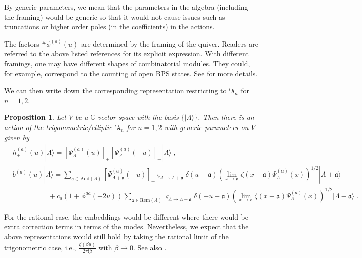 \documentclass[11pt]{article}
\numberwithin{equation}{section}
\numberwithin{figure}{section}
\numberwithin{table}{section}
\newtheorem{proposition}[theorem]{Proposition}
\newcommand{\ii}{\mathrm{i}}
\begin{document}
By generic parameters, we mean that the parameters in the algebra (including the framing) would be generic so that it would not cause issues such as truncations or higher order poles (in the coefficients) in the actions.

The factors ${}^\#\phi^{(a)}(u)$ are determined by the framing of the quiver. Readers are referred to the above listed references for its explicit expression. With different framings, one may have different shapes of combinatorial modules. They could, for example, correspond to the counting of open BPS states. See \cite{Galakhov:2021xum,Noshita:2021dgj} for more details.

We can then write down the corresponding representation restricting to ${}^\iota\mathtt{A}_n$ for $n=1,2$.
\begin{proposition}\label{iotaquiveralgYoungdiagramrep}
	Let $V$ be a $\mathbb{C}$-vector space with the basis $\{|\Lambda\rangle\}$. Then there is an action of the trigonometric/elliptic ${}^\iota\mathtt{A}_n$ for $n=1,2$ with generic parameters on $V$ given by
	\begin{subequations}
		\begin{align}
			&h^{(a)}_{\pm}(u)|\Lambda\rangle=\left[\Psi^{(a)}_\Lambda(u)\right]_\pm\left[\Psi^{(a)}_\Lambda(-u)\right]_\mp|\Lambda\rangle\;,\\
			&b^{(a)}(u)|\Lambda\rangle=\sum_{\mathfrak{a}\in\mathrm{Add}(\Lambda)}\left[\Psi^{(a)}_{\Lambda+\mathfrak{a}}(-u)\right]_+\varsigma_{\Lambda\rightarrow\Lambda+\mathfrak{a}}\delta(u-\mathfrak{a})\left(\lim_{x\rightarrow\mathfrak{a}}\zeta(x-\mathfrak{a})\Psi^{(a)}_\Lambda(x)\right)^{1/2}|\Lambda+\mathfrak{a}\rangle\nonumber\\
			&\qquad\qquad\quad+c_a(1+\phi^{aa}(-2u))\sum_{\mathfrak{a}\in\mathrm{Rem}(\Lambda)}\varsigma_{\Lambda\rightarrow\Lambda-\mathfrak{a}}\delta(-u-\mathfrak{a})\left(\lim_{x\rightarrow\mathfrak{a}}\zeta(x-\mathfrak{a})\Psi^{(a)}_\Lambda(x)\right)^{1/2}|\Lambda-\mathfrak{a}\rangle\;.
		\end{align}
	\end{subequations}
\end{proposition}
For the rational case, the embeddings would be different where there would be extra correction terms in terms of the modes. Nevertheless, we expect that the above representations would still hold by taking the rational limit of the trigonometric case, i.e., $\frac{\zeta(\beta u)}{2\pi\ii\beta}$ with $\beta\rightarrow0$. See also \cite[Section 4]{tsymbaliuk2017affine}.
\end{document}
